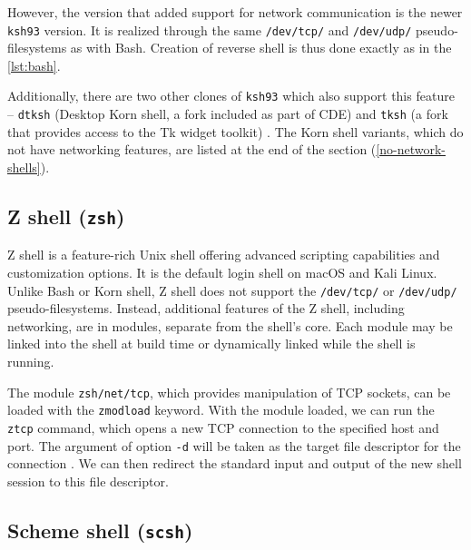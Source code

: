 However, the version that added support for network communication is the newer \texttt{ksh93} version. It is realized through the same \texttt{/dev/tcp/} and \texttt{/dev/udp/} pseudo-filesystems as with Bash. Creation of reverse shell is thus done exactly as in the \cref{lst:bash}.


Additionally, there are two other clones of \texttt{ksh93} which also support this feature -- \texttt{dtksh} (Desktop Korn shell, a fork included as part of CDE) and \texttt{tksh} (a fork that provides access to the Tk widget toolkit) \cite{kornshell-wiki}. The Korn shell variants, which do not have networking features, are listed at the end of the section (\cref{no-network-shells}).

\subsection{Z shell (\texttt{zsh})}


Z shell is a feature-rich Unix shell offering advanced scripting capabilities and customization options. It is the default login shell on macOS and Kali Linux. Unlike Bash or Korn shell, Z shell does not support the \texttt{/dev/tcp/} or \texttt{/dev/udp/} pseudo-filesystems. Instead, additional features of the Z shell, including networking, are in modules, separate from the shell's core. Each module may be linked into the shell at build time or dynamically linked while the shell is running. \cite{zshmodules-man}

The module \texttt{zsh/net/tcp}, which provides manipulation of TCP sockets, can be loaded with the \texttt{zmodload} keyword. With the module loaded, we can run the \texttt{ztcp} command, which opens a new TCP connection to the specified host and port. The argument of option \texttt{-d} will be taken as the target file descriptor for the connection \cite{zsh-net-tcp-doc}. We can then redirect the standard input and output of the new shell session to this file descriptor.




\subsection{Scheme shell (\texttt{scsh})}

